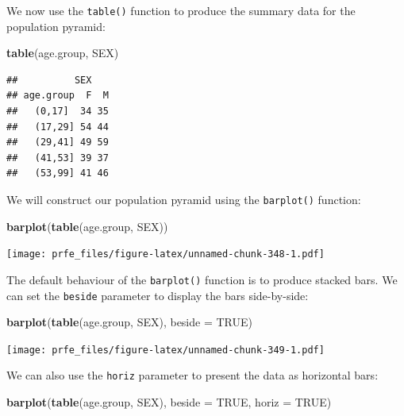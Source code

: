 \documentclass[12pt,a4paper]{book}
\newenvironment{Shaded}{\begin{snugshade}}{\end{snugshade}}
\newcommand{\KeywordTok}[1]{\textcolor[rgb]{0.13,0.29,0.53}{\textbf{#1}}}
\newcommand{\DataTypeTok}[1]{\textcolor[rgb]{0.13,0.29,0.53}{#1}}
\newcommand{\OtherTok}[1]{\textcolor[rgb]{0.56,0.35,0.01}{#1}}
\newcommand{\NormalTok}[1]{#1}
\theoremstyle{definition}
\theoremstyle{definition}
\theoremstyle{definition}
\theoremstyle{remark}
\begin{document}
We now use the \texttt{table()} function to produce the summary data for
the population pyramid:

\begin{Shaded}
\begin{Highlighting}[]
\KeywordTok{table}\NormalTok{(age.group, SEX)}
\end{Highlighting}
\end{Shaded}

\begin{verbatim}
##          SEX
## age.group  F  M
##   (0,17]  34 35
##   (17,29] 54 44
##   (29,41] 49 59
##   (41,53] 39 37
##   (53,99] 41 46
\end{verbatim}

We will construct our population pyramid using the \texttt{barplot()}
function:

\begin{Shaded}
\begin{Highlighting}[]
\KeywordTok{barplot}\NormalTok{(}\KeywordTok{table}\NormalTok{(age.group, SEX))}
\end{Highlighting}
\end{Shaded}

\texttt{[image: prfe\_files/figure-latex/unnamed-chunk-348-1.pdf]}

The default behaviour of the \texttt{barplot()} function is to produce
stacked bars. We can set the \texttt{beside} parameter to display the
bars side-by-side:

\begin{Shaded}
\begin{Highlighting}[]
\KeywordTok{barplot}\NormalTok{(}\KeywordTok{table}\NormalTok{(age.group, SEX), }\DataTypeTok{beside =} \OtherTok{TRUE}\NormalTok{)}
\end{Highlighting}
\end{Shaded}

\texttt{[image: prfe\_files/figure-latex/unnamed-chunk-349-1.pdf]}

We can also use the \texttt{horiz} parameter to present the data as
horizontal bars:

\begin{Shaded}
\begin{Highlighting}[]
\KeywordTok{barplot}\NormalTok{(}\KeywordTok{table}\NormalTok{(age.group, SEX), }\DataTypeTok{beside =} \OtherTok{TRUE}\NormalTok{, }\DataTypeTok{horiz =} \OtherTok{TRUE}\NormalTok{)}
\end{Highlighting}
\end{Shaded}
\end{document}
